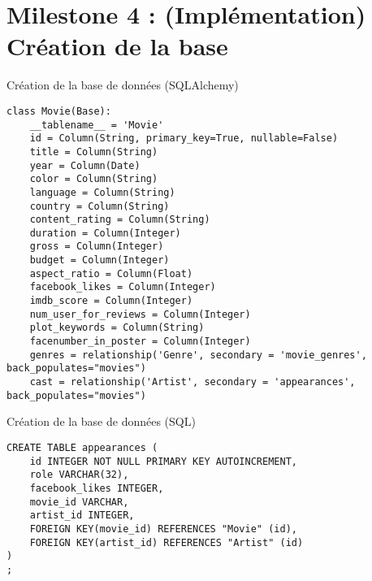 \documentclass[french]{beamer}
\begin{document}
\section{Milestone 4 : (Implémentation) Création de la base}
\label{sec:org42e5e79}
\begin{frame}[label={sec:org61a25d6},fragile,shrink=5]{Création de la base de données (SQLAlchemy)}
 \begin{verbatim}
class Movie(Base):
    __tablename__ = 'Movie'
    id = Column(String, primary_key=True, nullable=False) 
    title = Column(String)
    year = Column(Date)
    color = Column(String)
    language = Column(String)
    country = Column(String)
    content_rating = Column(String)
    duration = Column(Integer)
    gross = Column(Integer)
    budget = Column(Integer)
    aspect_ratio = Column(Float)
    facebook_likes = Column(Integer)
    imdb_score = Column(Integer)
    num_user_for_reviews = Column(Integer)
    plot_keywords = Column(String)
    facenumber_in_poster = Column(Integer)
    genres = relationship('Genre', secondary = 'movie_genres', back_populates="movies")
    cast = relationship('Artist', secondary = 'appearances', back_populates="movies")
\end{verbatim}
\end{frame}

\begin{frame}[label={sec:org648933e},fragile]{Création de la base de données (SQL)}
 \begin{verbatim}
CREATE TABLE appearances (
	id INTEGER NOT NULL PRIMARY KEY AUTOINCREMENT, 
	role VARCHAR(32), 
	facebook_likes INTEGER, 
	movie_id VARCHAR, 
	artist_id INTEGER, 
	FOREIGN KEY(movie_id) REFERENCES "Movie" (id), 
	FOREIGN KEY(artist_id) REFERENCES "Artist" (id)
)
;
\end{verbatim}
\end{frame}
\end{document}
